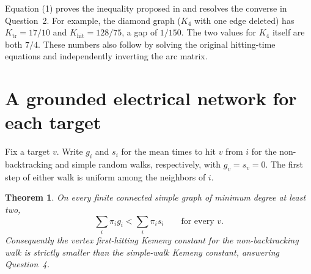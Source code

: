 \documentclass[11pt]{article}
\newtheorem{theorem}{Theorem}
\newcommand{\Kh}{K_{\mathrm{hit}}}
\newcommand{\Kt}{K_{\mathrm{tr}}}
\begin{document}
Equation (1) proves the inequality proposed in \cite[Eq.~(10)]{breen} and resolves the converse in Question~2. For example, the diamond graph ($K_4$ with one edge deleted) has $\Kt=17/10$ and $\Kh=128/75$, a gap of $1/150$. The two values for $K_4$ itself are both $7/4$. These numbers also follow by solving the original hitting-time equations and independently inverting the arc matrix.


\section{A grounded electrical network for each target}

Fix a target $v$. Write $g_i$ and $s_i$ for the mean times to hit $v$
from $i$ for the non-backtracking and simple random walks, respectively,
with $g_v=s_v=0$. The first step of either walk is uniform among the
neighbors of $i$.

\begin{theorem}
On every finite connected simple graph of minimum degree at least two,
\[
  \sum_i\pi_i g_i < \sum_i\pi_i s_i
  \qquad\text{for every }v .
\]
Consequently the vertex first-hitting Kemeny constant for the
non-backtracking walk is strictly smaller than the simple-walk
Kemeny constant, answering Question~4.
\end{theorem}
\end{document}
